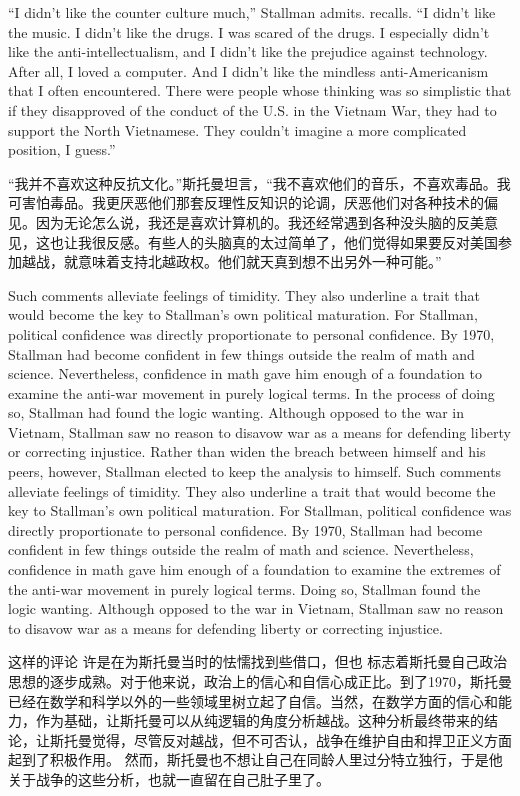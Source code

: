 \ifdefined\eng
``I didn't like the counter culture much,'' Stallman \ifdefined\vone admits. \fi\ifdefined\vtwo recalls. \fi ``I didn't like the music. I didn't like the drugs. I was scared of the drugs. I especially didn't like the anti-intellectualism, and I didn't like the prejudice against technology. After all, I loved a computer. And I didn't like the mindless anti-Americanism that I often encountered. There were people whose thinking was so simplistic that if they disapproved of the conduct of the U.S. in the Vietnam War, they had to support the North Vietnamese. They couldn't imagine a more complicated position, I guess.''
\fi

\ifdefined\chs
``我并不喜欢这种反抗文化。''斯托曼坦言，``我不喜欢他们的音乐，不喜欢毒品。我可害怕毒品。我更厌恶他们那套反理性反知识的论调，厌恶他们对各种技术的偏见。因为无论怎么说，我还是喜欢计算机的。我还经常遇到各种没头脑的反美意见，这也让我很反感。有些人的头脑真的太过简单了，他们觉得如果要反对美国参加越战，就意味着支持北越政权。他们就天真到想不出另外一种可能。''
\fi

\ifdefined\eng
\ifdefined\vone
Such comments alleviate feelings of timidity. They also underline a trait that would become the key to Stallman's own political maturation. For Stallman, political confidence was directly proportionate to personal confidence. By 1970, Stallman had become confident in few things outside the realm of math and science. Nevertheless, confidence in math gave him enough of a foundation to examine the anti-war movement in purely logical terms. In the process of doing so, Stallman had found the logic wanting. Although opposed to the war in Vietnam, Stallman saw no reason to disavow war as a means for defending liberty or correcting injustice. Rather than widen the breach between himself and his peers, however, Stallman elected to keep the analysis to himself.
\fi
\ifdefined\vtwo
Such comments alleviate feelings of timidity. They also underline a trait that would become the key to Stallman's own political maturation. For Stallman, political confidence was directly proportionate to personal confidence. By 1970, Stallman had become confident in few things outside the realm of math and science. Nevertheless, confidence in math gave him enough of a foundation to examine the extremes of the anti-war movement in purely logical terms.  Doing so, Stallman found the logic wanting. Although opposed to the war in Vietnam, Stallman saw no reason to disavow war as a means for defending liberty or correcting injustice.
\fi
\fi

\ifdefined\chs
这样的评论
\ifdefined\vone
许是在为斯托曼当时的怯懦找到些借口，但也
\fi
标志着斯托曼自己政治思想的逐步成熟。对于他来说，政治上的信心和自信心成正比。到了1970，斯托曼已经在数学和科学以外的一些领域里树立起了自信。当然，在数学方面的信心和能力，作为基础，让斯托曼可以从纯逻辑的角度分析越战。这种分析最终带来的结论，让斯托曼觉得，尽管反对越战，但不可否认，战争在维护自由和捍卫正义方面起到了积极作用。
\ifdefined\vone
然而，斯托曼也不想让自己在同龄人里过分特立独行，于是他关于战争的这些分析，也就一直留在自己肚子里了。
\fi
\fi

